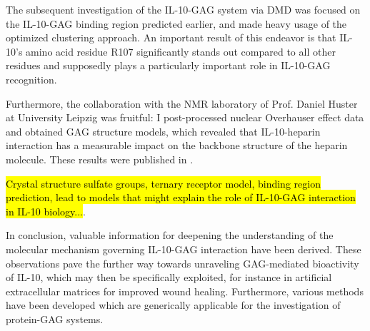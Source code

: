 The subsequent investigation of the IL-10-GAG system via DMD was focused on the
IL-10-GAG binding region predicted earlier, and made heavy usage of the
optimized clustering approach. An important result of this endeavor is that
IL-10's amino acid residue R107 significantly stands out compared to all other
residues and supposedly plays a particularly important role in IL-10-GAG
recognition.

Furthermore, the collaboration with the NMR laboratory of Prof. Daniel Huster at
University Leipzig was fruitful: I post-processed nuclear Overhauser effect data
and obtained GAG structure models, which revealed that IL-10-heparin interaction
has a measurable impact on the backbone structure of the heparin molecule. These
results were published in \cite{kuenze_gehrcke_2014}.

\hl{Crystal structure sulfate groups, ternary receptor model, binding region
prediction, lead to models that might explain the role of IL-10-GAG interaction
in IL-10 biology...}.

In conclusion, valuable information for deepening the understanding of the
molecular mechanism governing IL-10-GAG interaction have been derived. These
observations pave the further way towards unraveling GAG-mediated bioactivity of
IL-10, which may then be specifically exploited, for instance in artificial
extracellular matrices for improved wound healing. Furthermore, various methods
have been developed which are generically applicable for the investigation of
protein-GAG systems.

